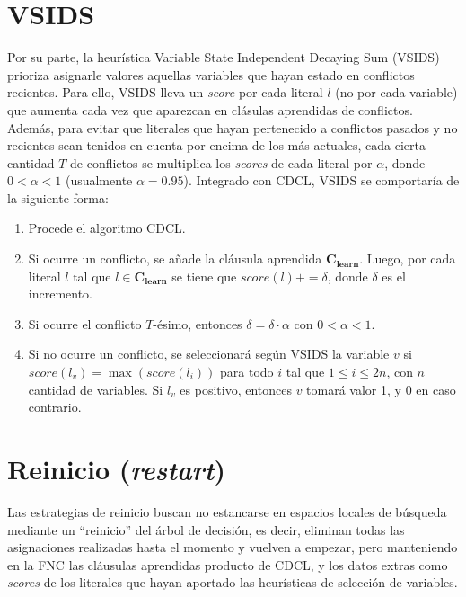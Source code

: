 \section{VSIDS}
Por su parte, la heurística Variable State Independent Decaying Sum (VSIDS) prioriza asignarle valores aquellas variables que hayan estado en conflictos recientes. Para ello, VSIDS lleva un \textit{score} por cada literal $l$ (no por cada variable) que aumenta cada vez que aparezcan en clásulas aprendidas de conflictos. Además, para evitar que literales que hayan pertenecido a conflictos pasados y no recientes sean tenidos en cuenta por encima de los más actuales, cada cierta cantidad $T$ de conflictos se multiplica los \textit{scores} de cada literal por $\alpha$, donde $0 < \alpha < 1$ (usualmente $\alpha = 0.95$). Integrado con CDCL, VSIDS se comportaría de la siguiente forma:
\begin{enumerate}
    \item Procede el algoritmo CDCL.
    \item Si ocurre un conflicto, se añade la cláusula aprendida $\mathbf{C_{learn}}$. Luego, por cada literal $l$ tal que $l \in \mathbf{C_{learn}}$ se tiene que $score(l) += \delta$, donde $\delta$ es el incremento.
    \item Si ocurre el conflicto $T$-ésimo, entonces $\delta = \delta \cdot \alpha$ con $0 < \alpha < 1$.
    \item Si no ocurre un conflicto, se seleccionará según VSIDS la variable $v$ si $score(l_v) = \max(score(l_i))$ para todo $i$ tal que $1 \leq i \leq 2n$, con $n$ cantidad de variables. Si $l_v$ es positivo, entonces $v$ tomará valor 1, y 0 en caso contrario.
\end{enumerate}



\section{Reinicio (\textit{restart})}
Las estrategias de reinicio buscan no estancarse en espacios locales de búsqueda mediante un ``reinicio'' del árbol de decisión, es decir, eliminan todas las asignaciones realizadas hasta el momento y vuelven a empezar, pero manteniendo en la FNC las cláusulas aprendidas producto de CDCL, y los datos extras como \textit{scores} de los literales que hayan aportado las heurísticas de selección de variables.

